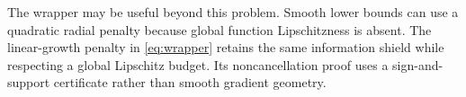 \documentclass[twoside]{article}
\begin{document}
The wrapper may be useful beyond this problem. Smooth lower bounds can use a quadratic radial penalty because global function Lipschitzness is absent. The linear-growth penalty in \eqref{eq:wrapper} retains the same information shield while respecting a global Lipschitz budget. Its noncancellation proof uses a sign-and-support certificate rather than smooth gradient geometry.


\end{document}
